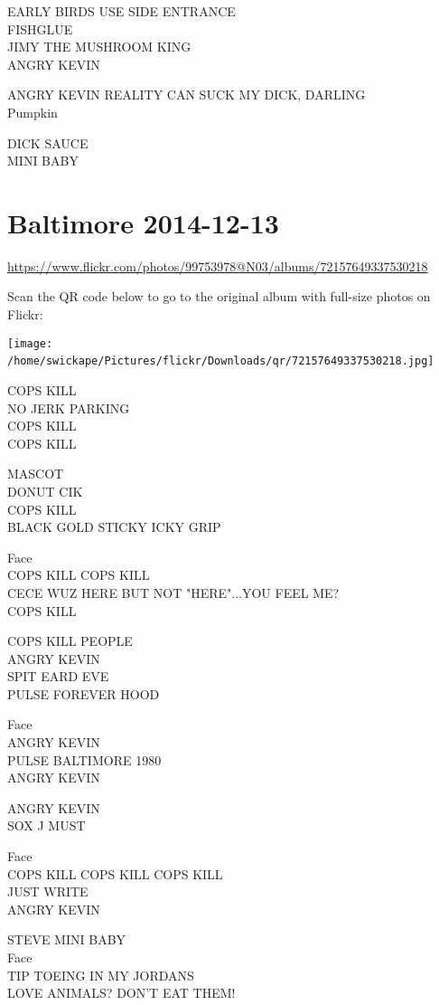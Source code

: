 \documentclass[10pt,letterpaper]{article}
\begin{document}
EARLY BIRDS USE SIDE ENTRANCE\\
FISHGLUE\\
JIMY THE MUSHROOM KING\\
ANGRY KEVIN

ANGRY KEVIN REALITY CAN SUCK MY DICK, DARLING\\
Pumpkin

DICK SAUCE\\
MINI BABY
\

\section*{Baltimore 2014-12-13}

\url{https://www.flickr.com/photos/99753978@N03/albums/72157649337530218}

Scan the QR code below to go to the original album with full-size photos on Flickr:

\texttt{[image: /home/swickape/Pictures/flickr/Downloads/qr/72157649337530218.jpg]}
\

COPS KILL\\
NO JERK PARKING\\
COPS KILL\\
COPS KILL

MASCOT\\
DONUT CIK\\
COPS KILL\\
BLACK GOLD STICKY ICKY GRIP

Face\\
COPS KILL COPS KILL\\
CECE WUZ HERE BUT NOT "HERE"...YOU FEEL ME?\\
COPS KILL

COPS KILL PEOPLE\\
ANGRY KEVIN\\
SPIT EARD EVE\\
PULSE FOREVER HOOD

Face\\
ANGRY KEVIN\\
PULSE BALTIMORE 1980\\
ANGRY KEVIN

ANGRY KEVIN\\
SOX J MUST

Face\\
COPS KILL COPS KILL COPS KILL\\
JUST WRITE\\
ANGRY KEVIN

STEVE MINI BABY\\
Face\\
TIP TOEING IN MY JORDANS\\
LOVE ANIMALS?  DON'T EAT THEM!
\end{document}
